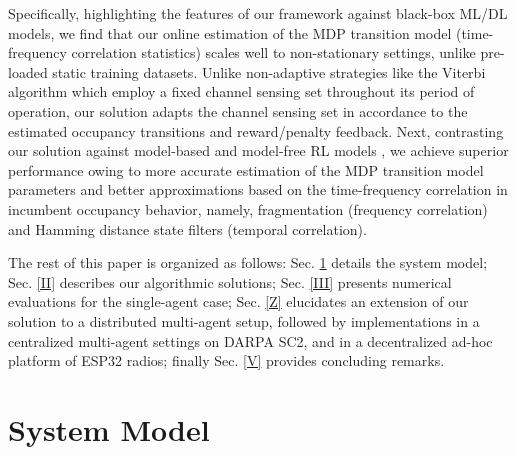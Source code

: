 \documentclass[12pt, draftcls, onecolumn]{IEEEtran}
\begin{document}
Specifically, highlighting the features of our framework against black-box ML/DL models, we find that our online estimation of the MDP transition model (time-frequency correlation statistics) scales well to non-stationary settings, unlike pre-loaded static training datasets. Unlike non-adaptive strategies like the Viterbi algorithm \cite{WCL:6} which employ a fixed channel sensing set throughout its period of operation, our solution adapts the channel sensing set in accordance to the estimated occupancy transitions and reward/penalty feedback. Next, contrasting our solution against model-based \cite{WCL:5} and model-free RL models \cite{WCL:DQN}, we achieve superior performance owing to more accurate estimation of the MDP transition model parameters and better approximations based on the time-frequency correlation in incumbent occupancy behavior, namely, fragmentation (frequency correlation) and Hamming distance state filters (temporal correlation).

The rest of this paper is organized as follows: Sec. \ref{I} details the system model; Sec. \ref{II} describes
our algorithmic solutions; Sec. \ref{III} presents numerical evaluations for the single-agent case; Sec. \ref{Z} elucidates an extension of our solution to a distributed multi-agent setup,
followed by implementations in a centralized multi-agent settings on DARPA SC2,
and in a decentralized ad-hoc platform of ESP32 radios;  finally Sec. \ref{V} provides concluding remarks.

\section{System Model}\label{I}
\end{document}
